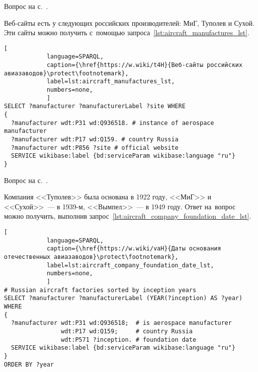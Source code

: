 \hfil{}\hfil%



\newpage
\begin{task}
    \label{answer:aircraft_manufacturers}
    \AnswerBackref Вопрос на с.~\pageref{lst:lang2}.

    Веб-сайты есть у следующих российских производителей: 
    МиГ, Туполев и Сухой. 
    Эти сайты можно получить с~помощью запроса~\ref{lst:aircraft_manufactures_lst}. 

\begin{lstlisting}[ 
            language=SPARQL, 
            caption={\href{https://w.wiki/t4H}{Веб-сайты российских авиазаводов}\protect\footnotemark}, 
            label=lst:aircraft_manufactures_lst, 
            numbers=none,
            ]
SELECT ?manufacturer ?manufacturerLabel ?site WHERE
{
  ?manufacturer wdt:P31 wd:Q936518. # instance of aerospace manufacturer
  ?manufacturer wdt:P17 wd:Q159. # country Russia
  ?manufacturer wdt:P856 ?site # official website
  SERVICE wikibase:label {bd:serviceParam wikibase:language "ru"}
}
\end{lstlisting}
\end{task}


\begin{task}
    \label{answer:aircraft_company_foundation_date}
    \AnswerBackref Вопрос на с.~\pageref{aircraft_question_2}.
    
    Компания 
<<Туполев>> была основана в 1922 году, 
<<МиГ>> и <<Сухой>>~--- в 1939-м, 
<<Вымпел>>~--- в 1949 году.
    Ответ на~вопрос можно получить, выполнив запрос~\ref{lst:aircraft_company_foundation_date_lst}. 
    
	\begin{lstlisting}[ 
            language=SPARQL, 
            caption={\href{https://w.wiki/vaH}{Даты основания отечественных авиазаводов}\protect\footnotemark}, 
            label=lst:aircraft_company_foundation_date_lst, 
            numbers=none,
            ]
# Russian aircraft factories sorted by inception years
SELECT ?manufacturer ?manufacturerLabel (YEAR(?inception) AS ?year) WHERE 
{
  ?manufacturer wdt:P31 wd:Q936518;  # is aerospace manufacturer
                wdt:P17 wd:Q159;     # country Russia
                wdt:P571 ?inception. # foundation date
  SERVICE wikibase:label {bd:serviceParam wikibase:language "ru"}
}
ORDER BY ?year
\end{lstlisting}
\end{task}


